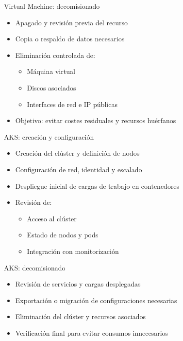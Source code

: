 \documentclass{beamer}
\begin{document}
\begin{frame}{Virtual Machine: decomisionado}
\begin{itemize}
    \item Apagado y revisión previa del recurso
    \item Copia o respaldo de datos necesarios
    \item Eliminación controlada de:
    \begin{itemize}
        \item Máquina virtual
        \item Discos asociados
        \item Interfaces de red e IP públicas
    \end{itemize}
    \item Objetivo: evitar costes residuales y recursos huérfanos
\end{itemize}
\end{frame}

\begin{frame}{AKS: creación y configuración}
\begin{itemize}
    \item Creación del clúster y definición de nodos
    \item Configuración de red, identidad y escalado
    \item Despliegue inicial de cargas de trabajo en contenedores
    \item Revisión de:
    \begin{itemize}
        \item Acceso al clúster
        \item Estado de nodos y pods
        \item Integración con monitorización
    \end{itemize}
\end{itemize}
\end{frame}

\begin{frame}{AKS: decomisionado}
\begin{itemize}
    \item Revisión de servicios y cargas desplegadas
    \item Exportación o migración de configuraciones necesarias
    \item Eliminación del clúster y recursos asociados
    \item Verificación final para evitar consumos innecesarios
\end{itemize}
\end{frame}
\end{document}
